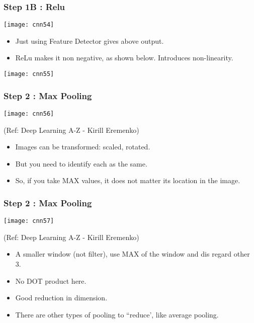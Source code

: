 \begin{frame}[fragile] \frametitle{Step 1B : Relu}

\begin{center}
\texttt{[image: cnn54]}
\end{center}

\begin{itemize}
\item Just using Feature Detector gives above output.
\item ReLu makes it non negative, as shown below. Introduces non-linearity.
\end{itemize}


\begin{center}
\texttt{[image: cnn55]}
\end{center}
\end{frame}

\begin{frame}[fragile] \frametitle{Step 2 : Max Pooling}

\begin{center}
\texttt{[image: cnn56]}

\tiny{(Ref: Deep Learning A-Z - Kirill Eremenko)}
\end{center}

\begin{itemize}
\item Images can be transformed: scaled, rotated.
\item But you need to identify each as the same.
\item So, if you take MAX values, it does not matter its location in the image.
\end{itemize}

\end{frame}

\begin{frame}[fragile] \frametitle{Step 2 : Max Pooling}

\begin{center}
\texttt{[image: cnn57]}

\tiny{(Ref: Deep Learning A-Z - Kirill Eremenko)}
\end{center}

\begin{itemize}
\item A smaller window (not filter), use MAX of the window and dis regard other 3. 
\item No DOT product here.
\item Good reduction in dimension.
\item There are other types of pooling to ``reduce', like average pooling.
\end{itemize}

\end{frame}

